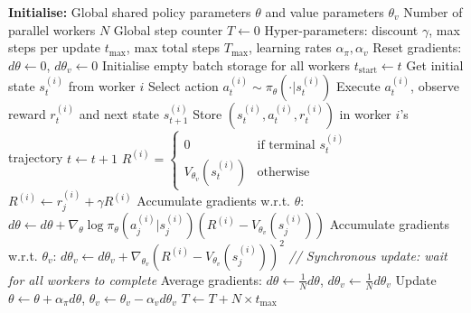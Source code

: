 \begin{algorithmic}
\State \textbf{Initialise:}
\State \quad Global shared policy parameters $\theta$ and value parameters $\theta_v$
\State \quad Number of parallel workers $N$
\State \quad Global step counter $T \gets 0$
\State \quad Hyper-parameters: discount $\gamma$, max steps per update $t_{\max}$, max total steps $T_{\max}$, learning rates $\alpha_\pi, \alpha_v$
\Repeat
    \State Reset gradients: $d\theta \gets 0$, $d\theta_v \gets 0$
    \State Initialise empty batch storage for all workers
        \State $t_{\text{start}} \gets t$
        \State Get initial state $s_t^{(i)}$ from worker $i$
        \Repeat
            \State Select action $a_t^{(i)} \sim \pi_\theta(\cdot | s_t^{(i)})$
            \State Execute $a_t^{(i)}$, observe reward $r_t^{(i)}$ and next state $s_{t+1}^{(i)}$
            \State Store $(s_t^{(i)}, a_t^{(i)}, r_t^{(i)})$ in worker $i$'s trajectory
            \State $t \gets t + 1$
        \State $R^{(i)} = 
            \begin{cases}
                0 & \text{if terminal } s_t^{(i)} \\
                V_{\theta_v}(s_t^{(i)}) & \text{otherwise}
            \end{cases}$
            \State $R^{(i)} \gets r_j^{(i)} + \gamma R^{(i)}$
            \State Accumulate gradients w.r.t. $\theta$:
            \State \quad $d\theta \gets d\theta + \nabla_{\theta} \log \pi_\theta(a_j^{(i)} | s_j^{(i)}) (R^{(i)} - V_{\theta_v}(s_j^{(i)}))$
            \State Accumulate gradients w.r.t. $\theta_v$:
            \State \quad $d\theta_v \gets d\theta_v + \nabla_{\theta_v} (R^{(i)} - V_{\theta_v}(s_j^{(i)}))^2$
        \EndFor
    \EndFor
    \State \textit{// Synchronous update: wait for all workers to complete}
    \State Average gradients: $d\theta \gets \frac{1}{N} d\theta$, $d\theta_v \gets \frac{1}{N} d\theta_v$
    \State Update $\theta \gets \theta + \alpha_\pi d\theta$, $\theta_v \gets \theta_v - \alpha_v d\theta_v$
    \State $T \gets T + N \times t_{\max}$
\end{algorithmic}

